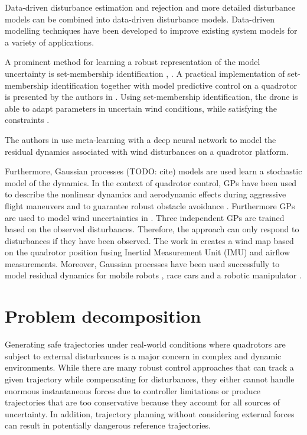 Data-driven disturbance estimation and rejection and more detailed disturbance models can be combined into data-driven disturbance models. Data-driven modelling techniques have been developed to improve existing system models for a variety of applications. 

A prominent method for learning a robust representation of the model uncertainty is set-membership identification \cite{lorenzen2019robust}, \cite{didier2021adaptive}. A practical implementation of set-membership identification together with model predictive control on a quadrotor is presented by the authors in \cite{didier2021robust}. Using set-membership identification, the drone is able to adapt parameters in uncertain wind conditions, while satisfying the constraints \cite{didier2021robust}. 

The authors in \cite{o2021meta} use meta-learning with a deep neural network to model the residual dynamics associated with wind disturbances on a quadrotor platform.

Furthermore, Gaussian processes (TODO: cite) models are used learn a stochastic model of the dynamics. In the context of quadrotor control, GPs have been used to describe the nonlinear dynamics and aerodynamic effects during aggressive flight maneuvers \cite{torrente2021data} and to guarantee robust obstacle avoidance \cite{garimella2017robust}. Furthermore GPs are used to model wind uncertainties in \cite{mehndiratta2020gaussian}. Three independent GPs are trained based on the observed disturbances. Therefore, the approach can only respond to disturbances if they have been observed. The work in \cite{tagliabue2021airflow} creates a wind map based on the quadrotor position fusing Inertial Measurement Unit (IMU) and airflow measurements. Moreover, Gaussian processes have been used successfully to model residual dynamics for mobile robots \cite{ostafew2016robust}, race cars \cite{kabzan2019learning} and a robotic manipulator \cite{carron2019data}.

\section{Problem decomposition}

Generating safe trajectories under real-world conditions where quadrotors are subject to external disturbances is a major concern in complex and dynamic environments. While there are many robust control approaches that can track a given trajectory while compensating for disturbances, they either cannot handle enormous instantaneous forces due to controller limitations or produce trajectories that are too conservative because they account for all sources of uncertainty. In addition, trajectory planning without considering external forces can result in potentially dangerous reference trajectories.

